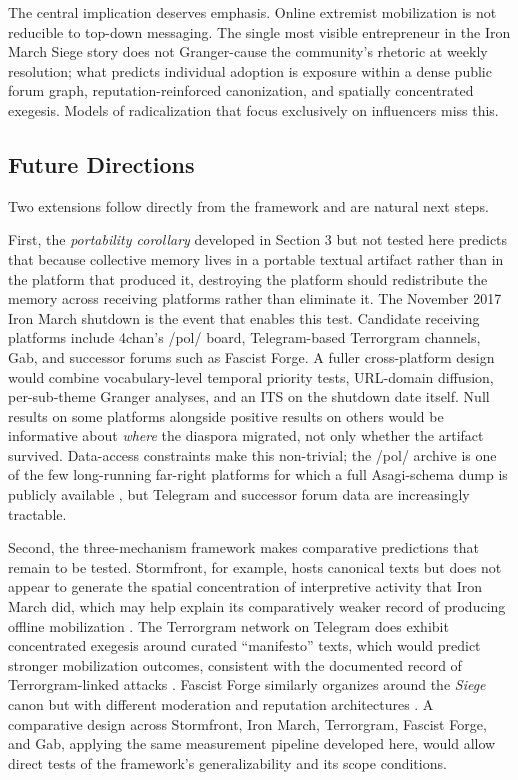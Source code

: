 \documentclass[bibtex,autowc,nonblind]{apsr_submission}
\begin{document}
The central implication deserves emphasis. Online extremist mobilization is not reducible to top-down messaging. The single most visible entrepreneur in the Iron March Siege story does not Granger-cause the community's rhetoric at weekly resolution; what predicts individual adoption is exposure within a dense public forum graph, reputation-reinforced canonization, and spatially concentrated exegesis. Models of radicalization that focus exclusively on influencers miss this.

\subsection*{Future Directions}

Two extensions follow directly from the framework and are natural next steps.

First, the \textit{portability corollary} developed in Section 3 but not tested here predicts that because collective memory lives in a portable textual artifact rather than in the platform that produced it, destroying the platform should redistribute the memory across receiving platforms rather than eliminate it. The November 2017 Iron March shutdown is the event that enables this test. Candidate receiving platforms include 4chan's /pol/ board, Telegram-based Terrorgram channels, Gab, and successor forums such as Fascist Forge. A fuller cross-platform design would combine vocabulary-level temporal priority tests, URL-domain diffusion, per-sub-theme Granger analyses, and an ITS on the shutdown date itself. Null results on some platforms alongside positive results on others would be informative about \textit{where} the diaspora migrated, not only whether the artifact survived. Data-access constraints make this non-trivial; the /pol/ archive is one of the few long-running far-right platforms for which a full Asagi-schema dump is publicly available \citep{hine2017kek, papasavva2020raiders}, but Telegram and successor forum data are increasingly tractable.

Second, the three-mechanism framework makes comparative predictions that remain to be tested. Stormfront, for example, hosts canonical texts but does not appear to generate the spatial concentration of interpretive activity that Iron March did, which may help explain its comparatively weaker record of producing offline mobilization \citep{caren2012social, bowman2009}. The Terrorgram network on Telegram does exhibit concentrated exegesis around curated ``manifesto'' texts, which would predict stronger mobilization outcomes, consistent with the documented record of Terrorgram-linked attacks \citep{newhouse2021threat, colin2024and}. Fascist Forge similarly organizes around the \textit{Siege} canon but with different moderation and reputation architectures \citep{lee2022}. A comparative design across Stormfront, Iron March, Terrorgram, Fascist Forge, and Gab, applying the same measurement pipeline developed here, would allow direct tests of the framework's generalizability and its scope conditions.
\end{document}
